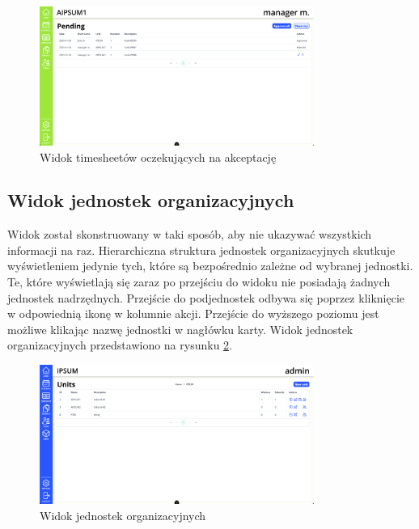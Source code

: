 \begin{figure}[H]
    \centering
    \includegraphics[width=0.8\textwidth, frame]{graf/front/timesheetManagerPending.png}
    \caption{Widok timesheetów oczekujących na akceptację}
    \label{fig:timesheetApprovalView}
\end{figure}


\subsection{Widok jednostek organizacyjnych}

Widok został skonstruowany w taki sposób, aby nie ukazywać wszystkich informacji na raz. Hierarchiczna struktura jednostek organizacyjnych skutkuje wyświetleniem jedynie tych, które są bezpośrednio zależne od wybranej jednostki. Te, które wyświetlają się zaraz po przejściu do widoku nie posiadają żadnych jednostek nadrzędnych. Przejście do podjednostek odbywa się poprzez kliknięcie w odpowiednią ikonę w kolumnie akcji. Przejście do wyższego poziomu jest możliwe klikając nazwę jednostki w nagłówku karty. Widok jednostek organizacyjnych przedstawiono na rysunku \ref{fig:unitsView}.

\begin{figure}[H]
    \centering
    \includegraphics[width=0.8\textwidth, frame]{graf/front/units.png}
    \caption{Widok jednostek organizacyjnych}
    \label{fig:unitsView}
\end{figure}

